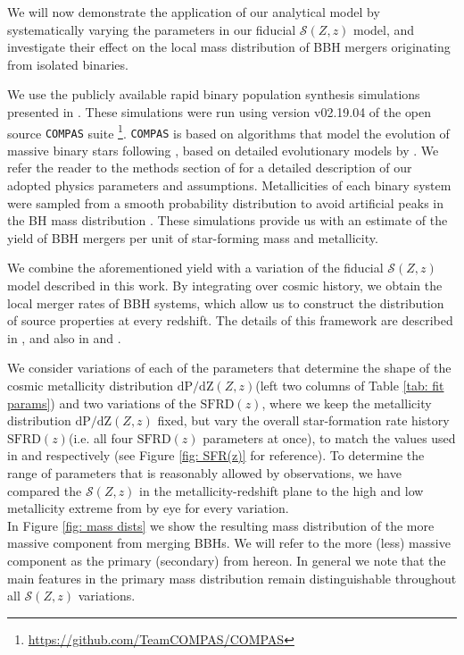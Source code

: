 \documentclass[twocolumn]{aastex631}
\newcommand{\SFRDzZ}{\ensuremath{\mathcal{S}(Z,z)}\xspace}
\newcommand{\SFRDz}{\ensuremath{\mathrm{SFRD}(z)}\xspace}
\newcommand{\dpdZ}{\ensuremath{\mathrm{dP/dZ}(Z,z)}\xspace}
\newcommand{\COMPAS}{{\tt COMPAS}\xspace}
\begin{document}
We will now demonstrate the application of our analytical model by systematically varying the parameters in our fiducial \SFRDzZ model, and investigate their effect on the local mass distribution of BBH mergers originating from isolated binaries. 


We use the publicly available rapid binary population synthesis simulations presented in \cite{vanson+2022}. 
These simulations were run using version v02.19.04 of the open source \COMPAS suite \citep{COMPAS_method} \footnote{\url{https://github.com/TeamCOMPAS/COMPAS}}. \COMPAS is based on algorithms that model the evolution of massive binary stars following \citet{Hurley+2000, Hurley+2002}, based on detailed evolutionary models by \citet{Pols+1998}.  We refer the reader to the methods section of \cite{vanson+2022} for a detailed description of our adopted physics parameters and assumptions.
%
Metallicities of each binary system were sampled from a smooth probability distribution to avoid artificial peaks in the BH mass distribution \citep[e.g.][]{Dominik2015,Kummer_thesis}. 
These simulations provide us with an estimate of the yield of BBH mergers per unit of star-forming mass and metallicity. 


We combine the aforementioned yield with a variation of the fiducial \SFRDzZ model described in this work. By integrating over cosmic history, we obtain the local merger rates of BBH systems, which allow us to construct the distribution of source properties at every redshift. The details of this framework are described in \cite{vanson+2022}, and also in \cite{Broekgaarden+2021a} and \cite{Neijssel+2019}. 

We consider variations of each of the parameters that determine the shape of the cosmic metallicity distribution \dpdZ (left two columns of Table \ref{tab: fit params}) and two variations of the \SFRDz, where we keep the metallicity distribution \dpdZ fixed, but vary the overall star-formation rate history  \SFRDz (i.e. all four \SFRDz parameters at once), to match the values used in \cite{Madau+2017} and \cite{Neijssel2019} respectively (see Figure \ref{fig: SFR(z)} for reference). To determine the range of parameters that is reasonably allowed by observations, we have compared the \SFRDzZ in the metallicity-redshift plane to the high and low metallicity extreme from \cite{Chruslinska+2021} by eye for every variation. \\


In Figure \ref{fig: mass dists} we show the resulting mass distribution of the more massive component from merging BBHs. We will refer to the more (less) massive component as the primary (secondary) from hereon. 
In general we note that the main features in the primary mass distribution remain distinguishable throughout all \SFRDzZ variations. 
\end{document}
